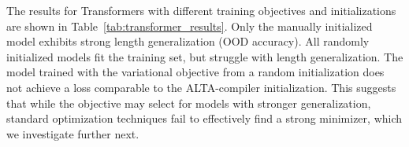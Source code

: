 The results for Transformers with different training objectives and initializations are shown in Table~\ref{tab:transformer_results}. Only the manually initialized model exhibits strong length generalization (OOD accuracy). All randomly initialized models fit the training set, but struggle with length generalization. The model trained with the variational objective from a random initialization does not achieve a loss comparable to the ALTA-compiler initialization. This suggests that while the objective may select for models with stronger generalization, standard optimization techniques fail to effectively find a strong minimizer, which we investigate further next.


\begin{table}[t!]
\centering
\caption{Transformer performance on parity task for different training objectives and initializations.}
\vspace{0.15cm}
\label{tab:transformer_results}
\end{table}


